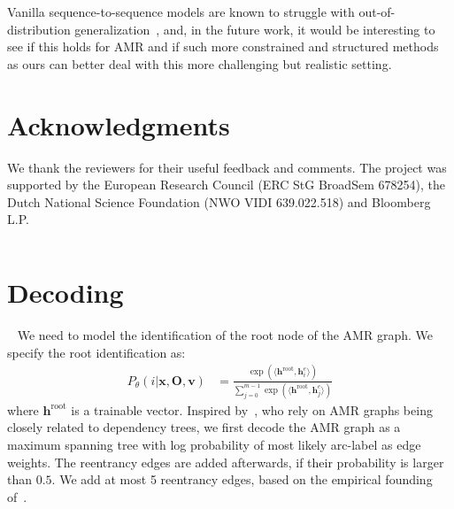 \documentclass[11pt]{article}
\begin{document}
Vanilla sequence-to-sequence models are known to struggle with out-of-distribution generalization~\cite{lake18a,bahdanau2018systematic}, and, in the future work, it would be interesting to see if this   holds for AMR and if such more constrained and structured methods as ours can better deal with this more challenging but realistic setting.

\section*{Acknowledgments}
We thank the reviewers for their useful feedback and comments.
The project was supported by the European Research Council (ERC StG BroadSem 678254), the Dutch National Science Foundation (NWO VIDI 639.022.518) and Bloomberg L.P.




\newpage

$\,$

\newpage

\appendix
\newpage\section{Decoding}~\label{append:seg_decode}
We need to model the identification of the root node of the AMR graph. We specify the root identification as:
\begin{align}
    P_\theta(i|\mathbf{x},\mathbf{O},\mathbf{v}) &=  \frac{\exp (\langle \mathbf{h}^\mathrm{root} , \mathbf{h}^e_i\rangle) }{\sum_{j =0 }^{m-1} \exp (\langle \mathbf{h}^\mathrm{root} ,\mathbf{h}^e_j\rangle)} 
\end{align}
where $\mathbf{h}^\mathrm{root}$ is a trainable vector. Inspired by~, who rely on AMR graphs being closely related to dependency trees, we first decode the AMR graph as a maximum spanning tree with log probability of most likely arc-label as edge weights. The reentrancy edges are added afterwards, if their probability is larger than $0.5$. We add at most 5 reentrancy edges, based on the empirical founding of~. 
\end{document}

